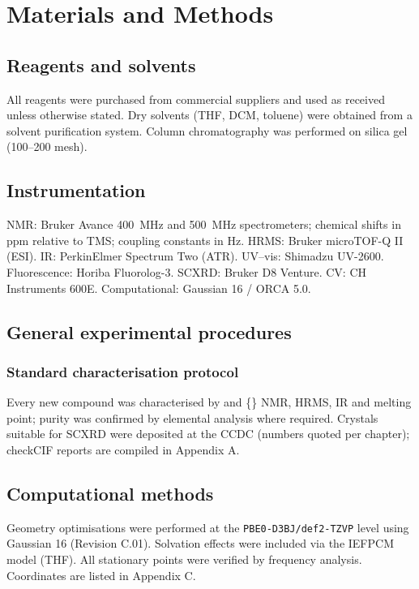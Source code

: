 \chapter{Materials and Methods}
\label{ch:methods}

\section{Reagents and solvents}
\label{sec:reagents}
All reagents were purchased from commercial suppliers and used as received
unless otherwise stated. Dry solvents (THF, DCM, toluene) were obtained from a
solvent purification system. Column chromatography was performed on silica gel
(100--200 mesh).

\section{Instrumentation}
\label{sec:instruments}
NMR: Bruker Avance \SI{400}{\mega\hertz} and \SI{500}{\mega\hertz}
spectrometers; chemical shifts in ppm relative to TMS; coupling constants in Hz.
HRMS: Bruker microTOF-Q II (ESI). IR: PerkinElmer Spectrum Two (ATR). UV--vis:
Shimadzu UV-2600. Fluorescence: Horiba Fluorolog-3. SCXRD: Bruker D8 Venture.
CV: CH Instruments 600E. Computational: Gaussian 16 / ORCA 5.0.

\section{General experimental procedures}
\label{sec:genproc}
\subsection{Standard characterisation protocol}
\label{sec:charproto}
Every new compound was characterised by  and \{\} NMR,
HRMS, IR and melting point; purity was confirmed by elemental analysis where
required. Crystals suitable for SCXRD were deposited at the CCDC (numbers
quoted per chapter); checkCIF reports are compiled in Appendix A.

\section{Computational methods}
\label{sec:compmethods}
Geometry optimisations were performed at the \texttt{PBE0-D3BJ/def2-TZVP} level
using Gaussian 16 (Revision C.01). Solvation effects were included via the
IEFPCM model (THF). All stationary points were verified by frequency analysis.
Coordinates are listed in Appendix C.
